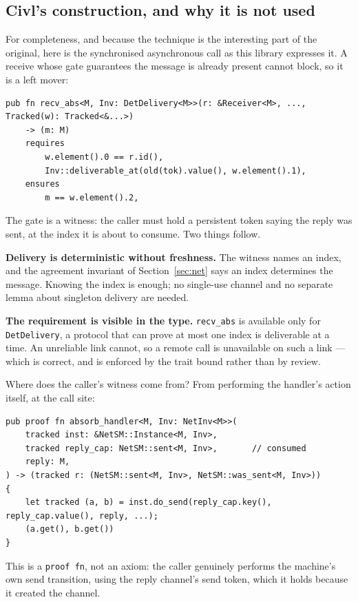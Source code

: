 \documentclass[11pt]{article}
\newcommand{\code}[1]{\texttt{#1}}
\newcommand{\srcname}[1]{%
  \vspace{0.9em}\noindent{\sffamily\scriptsize\color{comment}\MakeUppercase{#1}}\par
  \vspace{-0.7em}}
\begin{document}
\subsection*{Civl's construction, and why it is not used}

For completeness, and because the technique is the interesting part of the
original, here is the synchronised asynchronous call as this library expresses
it. A receive whose gate guarantees the message is already present cannot block,
so it is a left mover:

\srcname{src/tok.rs --- the abstracted receive}
\begin{lstlisting}
pub fn recv_abs<M, Inv: DetDelivery<M>>(r: &Receiver<M>, ..., Tracked(w): Tracked<&...>)
    -> (m: M)
    requires
        w.element().0 == r.id(),
        Inv::deliverable_at(old(tok).value(), w.element().1),
    ensures
        m == w.element().2,
\end{lstlisting}

The gate is a witness: the caller must hold a persistent token saying the reply
was sent, at the index it is about to consume. Two things follow.

\textbf{Delivery is deterministic without freshness.} The witness names an
index, and the agreement invariant of Section~\ref{sec:net} says an index
determines the message. Knowing the index is enough; no single-use channel and
no separate lemma about singleton delivery are needed.

\textbf{The requirement is visible in the type.} \code{recv\_abs} is available
only for \code{DetDelivery}, a protocol that can prove at most one index is
deliverable at a time. An unreliable link cannot, so a remote call is
unavailable on such a link --- which is correct, and is enforced by the trait
bound rather than by review.

Where does the caller's witness come from? From performing the handler's action
itself, at the call site:

\srcname{src/tok.rs}
\begin{lstlisting}
pub proof fn absorb_handler<M, Inv: NetInv<M>>(
    tracked inst: &NetSM::Instance<M, Inv>,
    tracked reply_cap: NetSM::sent<M, Inv>,       // consumed
    reply: M,
) -> (tracked r: (NetSM::sent<M, Inv>, NetSM::was_sent<M, Inv>))
{
    let tracked (a, b) = inst.do_send(reply_cap.key(), reply_cap.value(), reply, ...);
    (a.get(), b.get())
}
\end{lstlisting}

This is a \code{proof fn}, not an axiom: the caller genuinely performs the
machine's own send transition, using the reply channel's send token, which it
holds because it created the channel.
\end{document}

